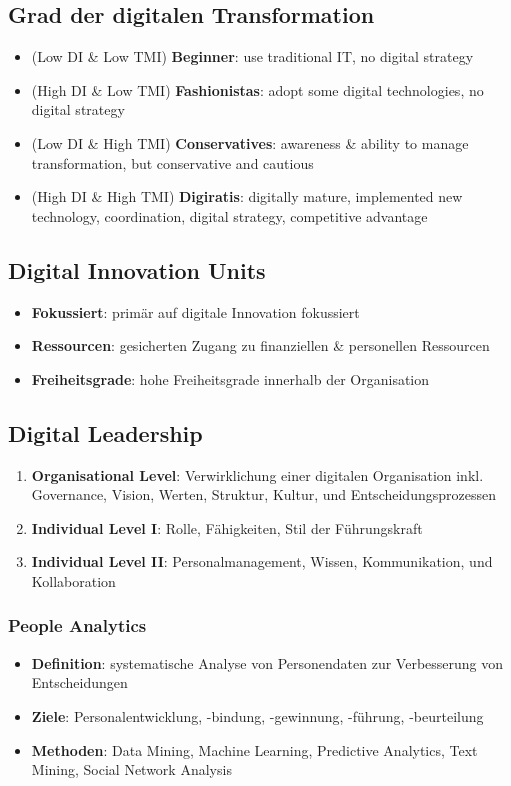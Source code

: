 \documentclass{article}
\begin{document}
\subsection{Grad der digitalen Transformation}
\begin{itemize}
  \item (Low DI \& Low TMI) \textbf{Beginner}: use traditional IT, no digital strategy
  \item (High DI \& Low TMI) \textbf{Fashionistas}: adopt some digital technologies, no digital strategy
  \item (Low DI \& High TMI) \textbf{Conservatives}: awareness \& ability to manage transformation, but conservative and cautious
  \item (High DI \& High TMI) \textbf{Digiratis}: digitally mature, implemented new technology, coordination, digital strategy, competitive advantage
\end{itemize}

\subsection{Digital Innovation Units}
\begin{itemize}
  \item \textbf{Fokussiert}: primär auf digitale Innovation fokussiert
  \item \textbf{Ressourcen}: gesicherten Zugang zu finanziellen \& personellen Ressourcen
  \item \textbf{Freiheitsgrade}: hohe Freiheitsgrade innerhalb der Organisation
\end{itemize}

\subsection{Digital Leadership}
\begin{enumerate}
  \item \textbf{Organisational Level}: Verwirklichung einer digitalen Organisation inkl. Governance, Vision, Werten, Struktur, Kultur, und Entscheidungsprozessen
  \item \textbf{Individual Level I}: Rolle, Fähigkeiten, Stil der Führungskraft
  \item \textbf{Individual Level II}: Personalmanagement, Wissen, Kommunikation, und Kollaboration
\end{enumerate}

\subsubsection{People Analytics}
\begin{itemize}
  \item \textbf{Definition}: systematische Analyse von Personendaten zur Verbesserung von Entscheidungen
  \item \textbf{Ziele}: Personalentwicklung, -bindung, -gewinnung, -führung, -beurteilung
  \item \textbf{Methoden}: Data Mining, Machine Learning, Predictive Analytics, Text Mining, Social Network Analysis
\end{itemize}
\end{document}
